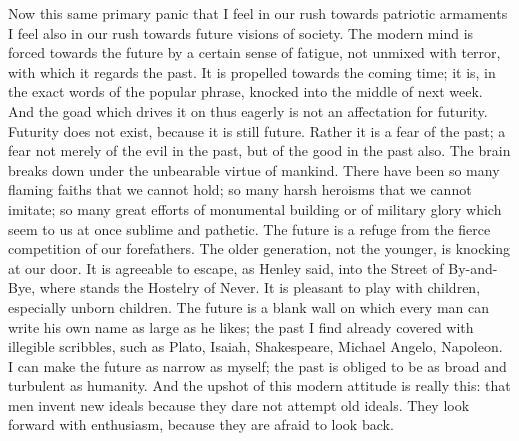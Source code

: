 \documentclass{book}
\begin{document}
Now this same primary panic that I feel in our rush towards patriotic armaments I feel also in our rush towards future visions of society. The modern mind is forced towards the future by a certain sense of fatigue, not unmixed with terror, with which it regards the past. It is propelled towards the coming time; it is, in the exact words of the popular phrase, knocked into the middle of next week. And the goad which drives it on thus eagerly is not an affectation for futurity. Futurity does not exist, because it is still future. Rather it is a fear of the past; a fear not merely of the evil in the past, but of the good in the past also. The brain breaks down under the unbearable virtue of mankind. There have been so many flaming faiths that we cannot hold; so many harsh heroisms that we cannot imitate; so many great efforts of monumental building or of military glory which seem to us at once sublime and pathetic. The future is a refuge from the fierce competition of our forefathers. The older generation, not the younger, is knocking at our door. It is agreeable to escape, as Henley said, into the Street of By-and-Bye, where stands the Hostelry of Never. It is pleasant to play with children, especially unborn children. The future is a blank wall on which every man can write his own name as large as he likes; the past I find already covered with illegible scribbles, such as Plato, Isaiah, Shakespeare, Michael Angelo, Napoleon. I can make the future as narrow as myself; the past is obliged to be as broad and turbulent as humanity. And the upshot of this modern attitude is really this: that men invent new ideals because they dare not attempt old ideals. They look forward with enthusiasm, because they are afraid to look back.
\end{document}
